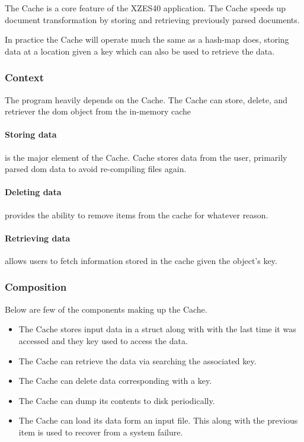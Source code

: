 The Cache is a core feature of the XZES40 application.
The Cache speeds up document transformation by storing and retrieving previously parsed documents.

In practice the Cache will operate much the same as a \gls{hash-map} does, storing data at a location given a key which can also be used to retrieve the data.

\subsubsection{Context}

The program heavily depends on the Cache.
The Cache can store, delete, and retriever the \gls{dom} object from the in-memory cache 

\paragraph{Storing data} is the major element of the Cache.
Cache stores data from the user, primarily parsed \gls{dom} data to avoid re-compiling files again.

\paragraph{Deleting data} provides the ability to remove items from the cache for whatever reason.

\paragraph{Retrieving data} allows users to fetch information stored in the cache given the object's key.


\subsubsection{Composition}

Below are few of the components making up the Cache.

\begin{itemize}
    \item The Cache stores input data in a \gls{struct} along with with the last time it was accessed and they key used to access the data.
    \item The Cache can retrieve the data via searching the associated key.
    \item The Cache can delete data corresponding with a key.
    \item The Cache can dump its contents to disk periodically.
    \item {
    	The Cache can load its data form an input file.
    	This along with the previous item is used to recover from a system failure.
    }
\end{itemize}

